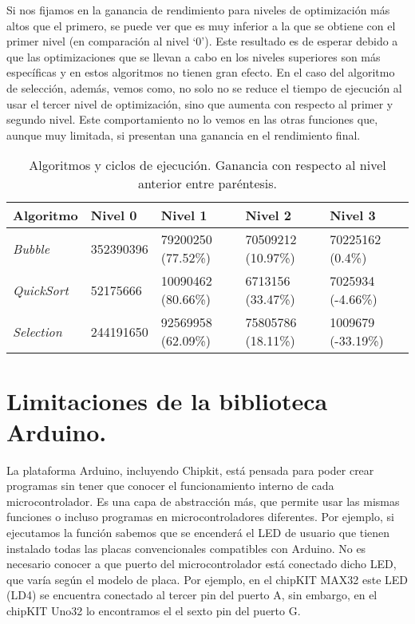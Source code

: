 Si nos fijamos en la ganancia de rendimiento para niveles de optimización más altos que el primero, se puede ver que es muy inferior a la que se obtiene con el primer nivel (en comparación al nivel `0'). Este resultado es de esperar debido a que las optimizaciones que se llevan a cabo en los niveles superiores son más específicas y en estos algoritmos no tienen gran efecto. En el caso del algoritmo de selección, además, vemos como, no solo no se reduce el tiempo de ejecución al usar el tercer nivel de optimización, sino que aumenta con respecto al primer y segundo nivel. Este comportamiento no lo vemos en las otras funciones que, aunque muy limitada, si presentan una ganancia en el rendimiento final.
\begin{table}[htb]
	\begin{center}
		\begin{tabular}{lllll}
      \textbf{Algoritmo} & \textbf{Nivel 0} & \textbf{Nivel 1} & \textbf{Nivel 2} & \textbf{Nivel 3} \\
      \hline
      \textit{Bubble		}&	352390396	&	79200250 (77.52\%)	&	70509212 (10.97\%)	&	70225162 (0.4\%) \\
			\textit{QuickSort	}	&	52175666	&	10090462	(80.66\%)	&	6713156 (33.47\%)	&	7025934 (-4.66\%) \\
			\textit{Selection	} &	244191650	&	92569958 (62.09\%)	&	75805786 (18.11\%)	&	1009679 (-33.19\%) \\
		\end{tabular}
	\end{center}
\caption{Algoritmos y ciclos de ejecución. Ganancia con respecto al nivel anterior entre paréntesis.}
\label{tabla:ciclos}
\end{table}
\section{Limitaciones de la biblioteca Arduino.} %
\label{sec:Limitaciones de la biblioteca Arduino.}

La plataforma Arduino, incluyendo Chipkit, está pensada para poder crear programas sin tener que conocer el funcionamiento interno de cada microcontrolador. Es una capa de abstracción más, que permite usar las mismas funciones o incluso programas en microcontroladores diferentes. Por ejemplo, si ejecutamos la función  sabemos que se encenderá el LED de usuario que tienen instalado todas las placas convencionales compatibles con Arduino. No es necesario conocer a que puerto del microcontrolador está conectado dicho LED, que varía según el modelo de placa. Por ejemplo, en el chipKIT MAX32 este LED (LD4) se encuentra conectado al tercer pin del puerto A, sin embargo, en el chipKIT Uno32 lo encontramos el el sexto pin del puerto G.\@

